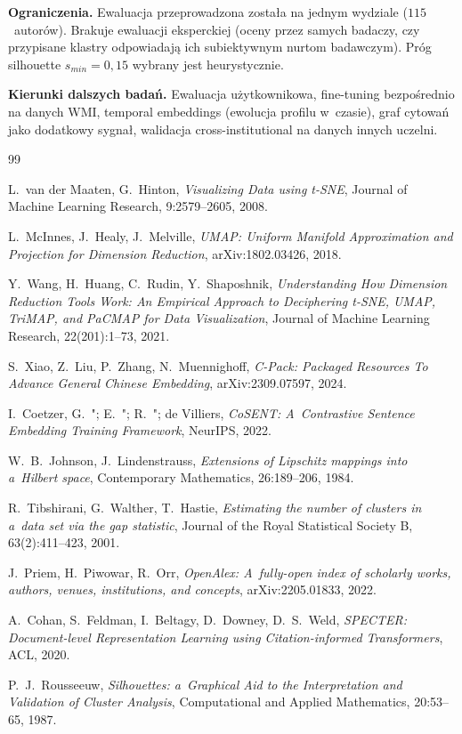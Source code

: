 \documentclass[a4paper,11pt,twocolumn]{article}
\begin{document}
\textbf{Ograniczenia.} Ewaluacja przeprowadzona została na jednym wydziale
($115$~autorów). Brakuje ewaluacji eksperckiej (oceny przez samych
badaczy, czy przypisane klastry odpowiadają ich subiektywnym nurtom
badawczym). Próg silhouette $s_{min}=0{,}15$ wybrany jest heurystycznie.

\textbf{Kierunki dalszych badań.} Ewaluacja użytkownikowa, fine-tuning
bezpośrednio na danych WMI, temporal embeddings (ewolucja profilu
w~czasie), graf cytowań jako dodatkowy sygnał, walidacja
cross-institutional na danych innych uczelni.


\small
\begin{thebibliography}{99}

L.~van der Maaten, G.~Hinton,
\emph{Visualizing Data using t-SNE},
Journal of Machine Learning Research, 9:2579--2605, 2008.

L.~McInnes, J.~Healy, J.~Melville,
\emph{UMAP: Uniform Manifold Approximation and Projection
for Dimension Reduction},
arXiv:1802.03426, 2018.

Y.~Wang, H.~Huang, C.~Rudin, Y.~Shaposhnik,
\emph{Understanding How Dimension Reduction Tools Work:
An Empirical Approach to Deciphering t-SNE, UMAP, TriMAP,
and PaCMAP for Data Visualization},
Journal of Machine Learning Research, 22(201):1--73, 2021.

S.~Xiao, Z.~Liu, P.~Zhang, N.~Muennighoff,
\emph{C-Pack: Packaged Resources To Advance General
Chinese Embedding},
arXiv:2309.07597, 2024.

I.~Coetzer, G.~"; E.~"; R.~"; de Villiers,
\emph{CoSENT: A~Contrastive Sentence Embedding Training
Framework},
NeurIPS, 2022.

W.~B.~Johnson, J.~Lindenstrauss,
\emph{Extensions of Lipschitz mappings into a~Hilbert space},
Contemporary Mathematics, 26:189--206, 1984.

R.~Tibshirani, G.~Walther, T.~Hastie,
\emph{Estimating the number of clusters in a~data set via
the gap statistic},
Journal of the Royal Statistical Society B, 63(2):411--423, 2001.

J.~Priem, H.~Piwowar, R.~Orr,
\emph{OpenAlex: A~fully-open index of scholarly works, authors,
venues, institutions, and concepts},
arXiv:2205.01833, 2022.

A.~Cohan, S.~Feldman, I.~Beltagy, D.~Downey, D.~S.~Weld,
\emph{SPECTER: Document-level Representation Learning using
Citation-informed Transformers},
ACL, 2020.

P.~J.~Rousseeuw,
\emph{Silhouettes: a~Graphical Aid to the Interpretation
and Validation of Cluster Analysis},
Computational and Applied Mathematics, 20:53--65, 1987.

\end{thebibliography}
\end{document}
